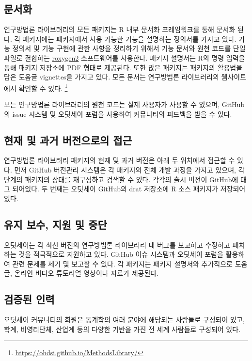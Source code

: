 \documentclass[10.5pt]{book}
\let\rmarkdownfootnote\footnote%
\def\footnote{\protect\rmarkdownfootnote}
\theoremstyle{definition}
\theoremstyle{definition}
\theoremstyle{definition}
\theoremstyle{remark}
\begin{document}
\subsection{문서화}\label{-1}

연구방법론 라이브러리의 모든 패키지는 R 내부 문서화 프레임워크를 통해
문서화 된다. 각 패키지에는 패키지에서 사용 가능한 기능을 설명하는
정의서를 가지고 있다. 기능 정의서 및 기능 구현에 관한 사항을 정리하기
위해서 기능 문서와 원천 코드를 단일 파일로 결합하는
\href{https://cran.r-project.org/web/packages/roxygen2/vignettes/roxygen2.html}{roxygen2}
소프트웨어를 사용한다. 패키지 설명서는 R의 명령 입력을 통해 패키지
저장소에 PDF 형태로 제공된다. 또한 많은 패키지는 패키지의 활용법을 담은
도움글 vignettes을 가지고 있다. 모든 문서는 연구방법론 라이브러리의
웹사이트에서 확인할 수 있다. \footnote{\url{https://ohdsi.github.io/MethodsLibrary/}}

모든 연구방법론 라이브러리의 원천 코드는 실제 사용자가 사용할 수 있으며,
GitHub의 issue 시스템 및 오딧세이 포럼을 사용하여 커뮤니티의 피드백을
받을 수 있다.

\subsection{현재 및 과거 버전으로의 접근}\label{----}

연구방법론 라이브러리 패키지의 현재 및 과거 버전은 아래 두 위치에서
접근할 수 있다. 먼저 GitHub 버전관리 시스템은 각 패키지의 전체 개발
과정을 가지고 있으며, 각 단계의 패키지의 상태를 재구성하고 검색할 수
있다. 각각의 출시 버전이 GitHub에 태그 되어있다. 두 번째는 오딧세이
GitHub의 drat 저장소에 R 소스 패키지가 저장되어 있다.

\subsection{유지 보수, 지원 및 중단}\label{----}

오딧세이는 각 최신 버전의 연구방법론 라이브러리 내 버그를 보고하고
수정하고 패치하는 것을 적극적으로 지원하고 있다. GitHub 이슈 시스템과
오딧세이 포럼을 활용하여 관련 문제를 제기 및 보고할 수 있다. 각 패키지는
패키지 설명서와 추가적으로 도움글, 온라인 비디오 튜토리얼 영상이나
자료가 제공된다.

\subsection{검증된 인력}\label{-}

오딧세이 커뮤니티의 회원은 통계학의 여러 분야에 해당되는 사람들로
구성되어 있고, 학계, 비영리단체, 산업계 등의 다양한 기반을 가진 전 세계
사람들로 구성되어 있다.
\end{document}
